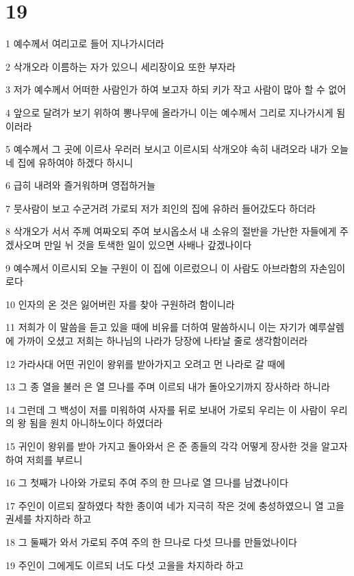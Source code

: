 \chapter{19}

\par 1 예수께서 여리고로 들어 지나가시더라
\par 2 삭개오라 이름하는 자가 있으니 세리장이요 또한 부자라
\par 3 저가 예수께서 어떠한 사람인가 하여 보고자 하되 키가 작고 사람이 많아 할 수 없어
\par 4 앞으로 달려가 보기 위하여 뽕나무에 올라가니 이는 예수께서 그리로 지나가시게 됨이러라
\par 5 예수께서 그 곳에 이르사 우러러 보시고 이르시되 삭개오야 속히 내려오라 내가 오늘 네 집에 유하여야 하겠다 하시니
\par 6 급히 내려와 즐거워하며 영접하거늘
\par 7 뭇사람이 보고 수군거려 가로되 저가 죄인의 집에 유하러 들어갔도다 하더라
\par 8 삭개오가 서서 주께 여짜오되 주여 보시옵소서 내 소유의 절반을 가난한 자들에게 주겠사오며 만일 뉘 것을 토색한 일이 있으면 사배나 갚겠나이다
\par 9 예수께서 이르시되 오늘 구원이 이 집에 이르렀으니 이 사람도 아브라함의 자손임이로다
\par 10 인자의 온 것은 잃어버린 자를 찾아 구원하려 함이니라
\par 11 저희가 이 말씀을 듣고 있을 때에 비유를 더하여 말씀하시니 이는 자기가 예루살렘에 가까이 오셨고 저희는 하나님의 나라가 당장에 나타날 줄로 생각함이러라
\par 12 가라사대 어떤 귀인이 왕위를 받아가지고 오려고 먼 나라로 갈 때에
\par 13 그 종 열을 불러 은 열 므나를 주며 이르되 내가 돌아오기까지 장사하라 하니라
\par 14 그런데 그 백성이 저를 미워하여 사자를 뒤로 보내어 가로되 우리는 이 사람이 우리의 왕 됨을 원치 아니하노이다 하였더라
\par 15 귀인이 왕위를 받아 가지고 돌아와서 은 준 종들의 각각 어떻게 장사한 것을 알고자 하여 저희를 부르니
\par 16 그 첫째가 나아와 가로되 주여 주의 한 므나로 열 므나를 남겼나이다
\par 17 주인이 이르되 잘하였다 착한 종이여 네가 지극히 작은 것에 충성하였으니 열 고을 권세를 차지하라 하고
\par 18 그 둘째가 와서 가로되 주여 주의 한 므나로 다섯 므나를 만들었나이다
\par 19 주인이 그에게도 이르되 너도 다섯 고을을 차지하라 하고
